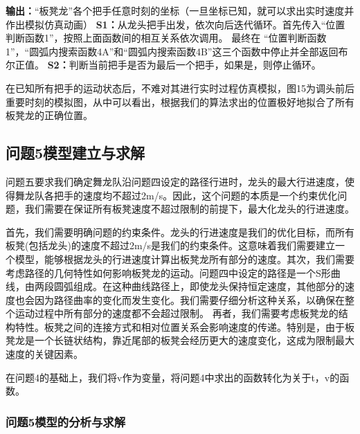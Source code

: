 \documentclass{cumcmthesis1}
\begin{document}
\newline
\noindent
\textbf{输出：}“板凳龙”各个把手任意时刻的坐标（一旦坐标已知，就可以求出实时速度并作出模拟仿真动画）
\newline
\noindent
\textbf{S1：}从龙头把手出发，依次向后迭代循环。首先传入“位置判断函数1”，按照上面函数间的相互关系依次调用。
最终在
“位置判断函数1”，“圆弧内搜索函数4A”和“圆弧内搜索函数4B”这三个函数中停止并全部返回布尔正值。
\newline
\noindent
\textbf{S2：}判断当前把手是否为最后一个把手，如果是，则停止循环。
\par
在已知所有把手的运动状态后，不难对其进行实时过程仿真模拟，图15为调头前后重要时刻的模拟图，从中可以看出，根据我们的算法求出的位置极好地拟合了所有板凳龙的正确位置。

\subsection{\textbf{问题5}模型建立与求解}
问题五要求我们确定舞龙队沿问题四设定的路径行进时，龙头的最大行进速度，使得舞龙队各把手的速度均不超过2m/s。因此，这个问题的本质是一个约束优化问题，我们需要在保证所有板凳速度不超过限制的前提下，最大化龙头的行进速度。
\par
首先，我们需要明确问题的约束条件。龙头的行进速度是我们的优化目标，而所有板凳(包括龙头)的速度不超过2m/s是我们的约束条件。这意味着我们需要建立一个模型，能够根据龙头的行进速度计算出板凳龙所有部分的速度。其次，我们需要考虑路径的几何特性如何影响板凳龙的运动。问题四中设定的路径是一个S形曲线，由两段圆弧组成。在这种曲线路径上，即使龙头保持恒定速度，其他部分的速度也会因为路径曲率的变化而发生变化。我们需要仔细分析这种关系，以确保在整个运动过程中所有部分的速度都不会超过限制。
再者，我们需要考虑板凳龙的结构特性。板凳之间的连接方式和相对位置关系会影响速度的传递。特别是，由于板凳龙是一个长链状结构，靠近尾部的板凳会经历更大的速度变化，这成为限制最大速度的关键因素。
\par
在问题4的基础上，我们将v作为变量，将问题4中求出的函数转化为关于t，v的函数。

\subsubsection{\textbf{问题5}模型的分析与求解}
\end{document}
